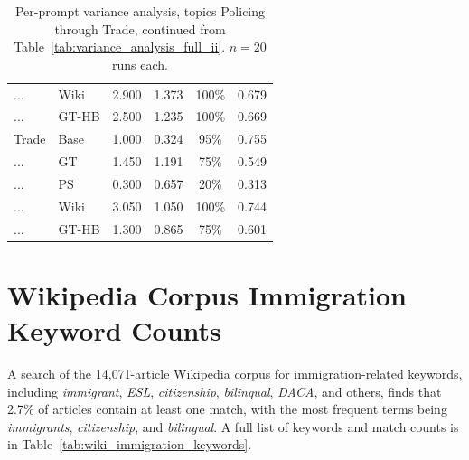 \documentclass[11pt]{article}
\begin{document}
\begin{table}[t]
\begin{tabular}{llcccc}
    ...              & Wiki &2.900 & 1.373 & 100\% & 0.679 \\
    ...              & GT-HB & 2.500 & 1.235 & 100\% & 0.669 \\
    \addlinespace
    Trade            & Base & 1.000 & 0.324 & 95\% & 0.755 \\
    ...              & GT   & 1.450 & 1.191 & 75\% & 0.549 \\
    ...              & PS   & 0.300 & 0.657 & 20\% & 0.313 \\
    ...              & Wiki &3.050 & 1.050 & 100\% & 0.744 \\
    ...              & GT-HB & 1.300 & 0.865 & 75\% & 0.601 \\
  \bottomrule
  \end{tabular}
  \caption{Per-prompt variance analysis, topics Policing through Trade, continued from Table~\ref{tab:variance_analysis_full_ii}. $n=20$ runs each.}
  \label{tab:variance_analysis_full_iii}
\end{table}



\section{Wikipedia Corpus Immigration Keyword Counts}

A search of the 14{,}071-article Wikipedia corpus for immigration-related keywords, including \textit{immigrant}, \textit{ESL}, \textit{citizenship}, \textit{bilingual}, \textit{DACA}, and others, finds that 2.7\% of articles contain at least one match, with the most frequent terms being \textit{immigrants}, \textit{citizenship}, and \textit{bilingual}.
A full list of keywords and match counts is in Table~\ref{tab:wiki_immigration_keywords}.
\end{document}
